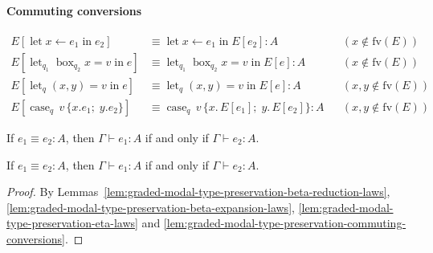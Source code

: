 \documentclass[acmsmall,screen,nonacm]{acmart}
\makeatletter
\DeclareMathOperator{\llet}{\text{let}}
\DeclareMathOperator{\lin}{\text{in}}
\DeclareMathOperator{\case}{\text{case}}
\DeclareMathOperator{\bbox}{\text{box}}
\DeclareMathOperator{\unbox}{\text{unbox}}
\newcommand{\at}{\mathbin{\mbox{\small\ensuremath{@}}}}
\DeclareMathOperator{\inl}{\text{inl}}
\DeclareMathOperator{\inr}{\text{inr}}
\newcommand{\tee}{\vdash}
\DeclareMathOperator{\red}{\rightsquigarrow}
\makeatother
\begin{document}
\paragraph{Commuting conversions}

\begin{align*}
  E[\llet x \leftarrow e_1 \lin e_2]
    &\equiv \llet x \leftarrow e_1 \lin E[e_2] : A
    && (x \notin \mathrm{fv}(E)) \\
  E[\llet_{q_1} \bbox_{q_2} x = v \lin e]
    &\equiv \llet_{q_1} \bbox_{q_2} x = v \lin E[e] : A
    && (x \notin \mathrm{fv}(E)) \\
  E[\llet_q (x, y) = v \lin e]
    &\equiv \llet_q (x, y) = v \lin E[e] : A
    && (x, y \notin \mathrm{fv}(E)) \\
  E[\case_q\, v\, \{x.e_1;\; y.e_2\}]
    &\equiv \case_q\, v\, \{x.\, E[e_1];\; y.\, E[e_2]\} : A
    && (x, y \notin \mathrm{fv}(E))
\end{align*}

\begin{lemma}
\label{lem:graded-modal-type-preservation-commuting-conversions}
  If\/ $e_1 \equiv e_2 : A$, then $\Gamma \tee e_1 : A$ if and only if $\Gamma \tee e_2 : A$.
\end{lemma}

\begin{theorem}
\label{lem:graded-modal-type-preservation}
  If\/ $e_1 \equiv e_2 : A$, then $\Gamma \tee e_1 : A$ if and only if $\Gamma \tee e_2 : A$.
\end{theorem}
\begin{proof}
  By Lemmas~\ref{lem:graded-modal-type-preservation-beta-reduction-laws}, \ref{lem:graded-modal-type-preservation-beta-expansion-laws}, \ref{lem:graded-modal-type-preservation-eta-laws} and \ref{lem:graded-modal-type-preservation-commuting-conversions}.
\end{proof}



\end{document}
